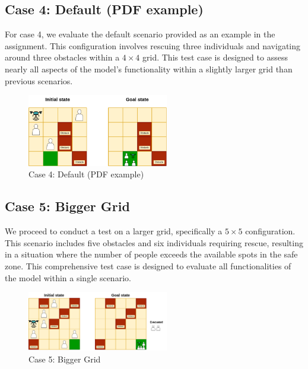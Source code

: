 \documentclass{article}
\begin{document}
\subsection{Case 4: Default (PDF example)}

For case 4, we evaluate the default scenario provided as an example in the assignment. This configuration involves rescuing three individuals and navigating around three obstacles within a \(4 \times 4\) grid. This test case is designed to assess nearly all aspects of the model's functionality within a slightly larger grid than previous scenarios.

\begin{figure}[ht]
    \centering
    \includegraphics[width=0.55\textwidth]{assets/problem-4-pdf-example.drawio.png}
    \caption{Case 4: Default (PDF example)}
    \label{fig:initial-state-default}
\end{figure}

\FloatBarrier

\subsection{Case 5: Bigger Grid}

We proceed to conduct a test on a larger grid, specifically a \(5 \times 5\) configuration. This scenario includes five obstacles and six individuals requiring rescue, resulting in a situation where the number of people exceeds the available spots in the safe zone. This comprehensive test case is designed to evaluate all functionalities of the model within a single scenario.

\begin{figure}[ht]
    \centering
    \includegraphics[width=0.55\textwidth]{assets/problem-5-big.drawio.png}
    \caption{Case 5: Bigger Grid}
    \label{fig:initial-state-bigger-grid}
\end{figure}
\end{document}
